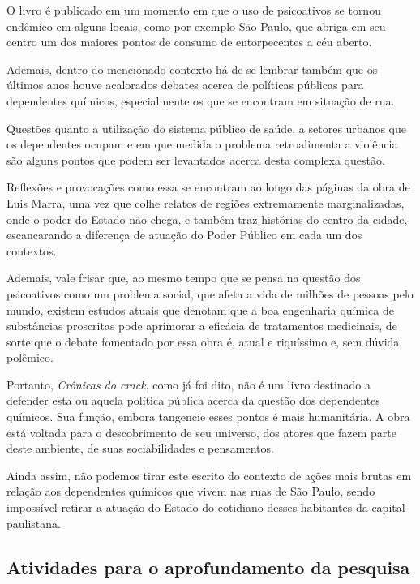 \documentclass[12pt]{extarticle}
\begin{document}
O livro é publicado em um momento em que o uso de psicoativos se tornou
endêmico em alguns locais, como por exemplo São Paulo, que abriga em seu
centro um dos maiores pontos de consumo de entorpecentes a céu aberto.


Ademais, dentro do mencionado contexto há de se lembrar também que os
últimos anos houve acalorados debates acerca de políticas públicas para
dependentes químicos, especialmente os que se encontram em situação de
rua.

Questões quanto a utilização do sistema público de saúde, a setores
urbanos que os dependentes ocupam e em que medida o problema
retroalimenta a violência são alguns pontos que podem ser levantados
acerca desta complexa questão.

Reflexões e provocações como essa se encontram ao longo das páginas da
obra de Luis Marra, uma vez que colhe relatos de regiões extremamente
marginalizadas, onde o poder do Estado não chega, e também traz
histórias do centro da cidade, escancarando a diferença de atuação do
Poder Público em cada um dos contextos.

Ademais, vale frisar que, ao mesmo tempo que se pensa na questão dos
psicoativos como um problema social, que afeta a vida de milhões de
pessoas pelo mundo, existem estudos atuais que denotam que a boa
engenharia química de substâncias proscritas pode aprimorar a eficácia
de tratamentos medicinais, de sorte que o debate fomentado por essa obra
é, atual e riquíssimo e, sem dúvida, polêmico.

Portanto, \emph{Crônicas do crack}, como já foi dito, não é um livro destinado
a defender esta ou aquela política pública acerca da questão dos
dependentes químicos. Sua função, embora tangencie esses pontos é mais
humanitária. A obra está voltada para o descobrimento de seu universo,
dos atores que fazem parte deste ambiente, de suas sociabilidades e
pensamentos.

Ainda assim, não podemos tirar este escrito do contexto de ações mais
brutas em relação aos dependentes químicos que vivem nas ruas de São
Paulo, sendo impossível retirar a atuação do Estado do cotidiano desses
habitantes da capital paulistana.

\subsection{Atividades para o aprofundamento da pesquisa}
\end{document}
